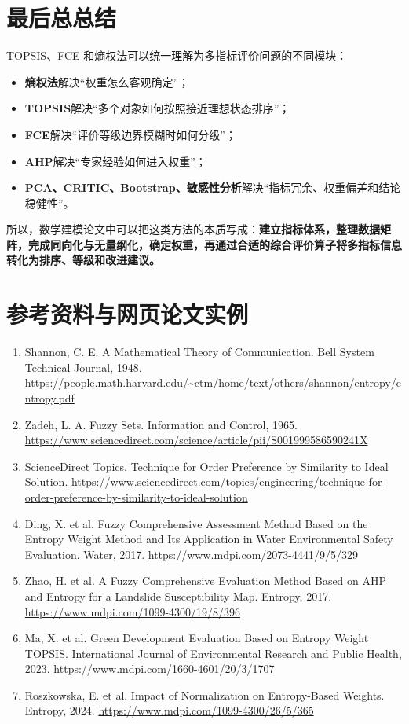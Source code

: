 \documentclass[UTF8,zihao=-4]{ctexart}
\begin{document}
\section{最后总总结}
TOPSIS、FCE 和熵权法可以统一理解为多指标评价问题的不同模块：
\begin{itemize}
  \item \textbf{熵权法}解决“权重怎么客观确定”；
  \item \textbf{TOPSIS}解决“多个对象如何按照接近理想状态排序”；
  \item \textbf{FCE}解决“评价等级边界模糊时如何分级”；
  \item \textbf{AHP}解决“专家经验如何进入权重”；
  \item \textbf{PCA、CRITIC、Bootstrap、敏感性分析}解决“指标冗余、权重偏差和结论稳健性”。
\end{itemize}

所以，数学建模论文中可以把这类方法的本质写成：\textbf{建立指标体系，整理数据矩阵，完成同向化与无量纲化，确定权重，再通过合适的综合评价算子将多指标信息转化为排序、等级和改进建议。}

\section*{参考资料与网页论文实例}
\begin{enumerate}
  \item Shannon, C. E. A Mathematical Theory of Communication. Bell System Technical Journal, 1948. \url{https://people.math.harvard.edu/~ctm/home/text/others/shannon/entropy/entropy.pdf}
  \item Zadeh, L. A. Fuzzy Sets. Information and Control, 1965. \url{https://www.sciencedirect.com/science/article/pii/S001999586590241X}
  \item ScienceDirect Topics. Technique for Order Preference by Similarity to Ideal Solution. \url{https://www.sciencedirect.com/topics/engineering/technique-for-order-preference-by-similarity-to-ideal-solution}
  \item Ding, X. et al. Fuzzy Comprehensive Assessment Method Based on the Entropy Weight Method and Its Application in Water Environmental Safety Evaluation. Water, 2017. \url{https://www.mdpi.com/2073-4441/9/5/329}
  \item Zhao, H. et al. A Fuzzy Comprehensive Evaluation Method Based on AHP and Entropy for a Landslide Susceptibility Map. Entropy, 2017. \url{https://www.mdpi.com/1099-4300/19/8/396}
  \item Ma, X. et al. Green Development Evaluation Based on Entropy Weight TOPSIS. International Journal of Environmental Research and Public Health, 2023. \url{https://www.mdpi.com/1660-4601/20/3/1707}
  \item Roszkowska, E. et al. Impact of Normalization on Entropy-Based Weights. Entropy, 2024. \url{https://www.mdpi.com/1099-4300/26/5/365}
\end{enumerate}
\end{document}

